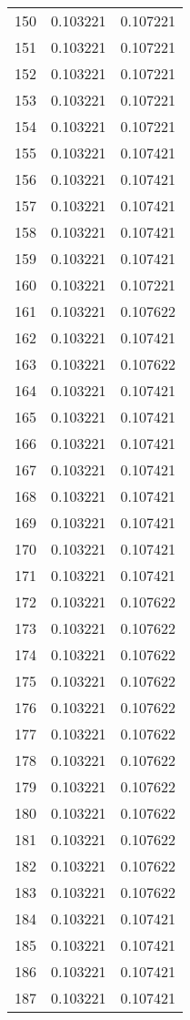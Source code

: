 \begin{longtable}{rrr}
150 & 0.103221 & 0.107221 \\
151 & 0.103221 & 0.107221 \\
152 & 0.103221 & 0.107221 \\
153 & 0.103221 & 0.107221 \\
154 & 0.103221 & 0.107221 \\
155 & 0.103221 & 0.107421 \\
156 & 0.103221 & 0.107421 \\
157 & 0.103221 & 0.107421 \\
158 & 0.103221 & 0.107421 \\
159 & 0.103221 & 0.107421 \\
160 & 0.103221 & 0.107221 \\
161 & 0.103221 & 0.107622 \\
162 & 0.103221 & 0.107421 \\
163 & 0.103221 & 0.107622 \\
164 & 0.103221 & 0.107421 \\
165 & 0.103221 & 0.107421 \\
166 & 0.103221 & 0.107421 \\
167 & 0.103221 & 0.107421 \\
168 & 0.103221 & 0.107421 \\
169 & 0.103221 & 0.107421 \\
170 & 0.103221 & 0.107421 \\
171 & 0.103221 & 0.107421 \\
172 & 0.103221 & 0.107622 \\
173 & 0.103221 & 0.107622 \\
174 & 0.103221 & 0.107622 \\
175 & 0.103221 & 0.107622 \\
176 & 0.103221 & 0.107622 \\
177 & 0.103221 & 0.107622 \\
178 & 0.103221 & 0.107622 \\
179 & 0.103221 & 0.107622 \\
180 & 0.103221 & 0.107622 \\
181 & 0.103221 & 0.107622 \\
182 & 0.103221 & 0.107622 \\
183 & 0.103221 & 0.107622 \\
184 & 0.103221 & 0.107421 \\
185 & 0.103221 & 0.107421 \\
186 & 0.103221 & 0.107421 \\
187 & 0.103221 & 0.107421 \\

\end{longtable}

